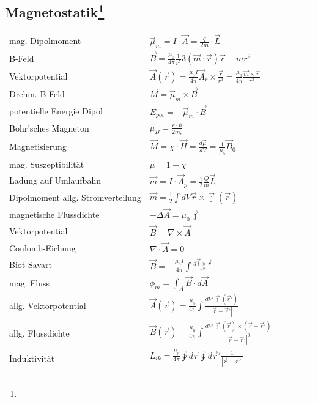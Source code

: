 \documentclass[12pt,a4paper]{article}
\newcommand{\abs}[1]{\left| #1 \right|}
\renewcommand{\=}[1]{\stackrel{#1}{=}}
\newcommand{\rd}{\abs{\vec r - \vec r'}}
\newcommand{\ort}{\vec r}
\theoremstyle{definition}
\theoremstyle{remark}
\begin{document}
\subsection[Magnetostatik]{Magnetostatik\let\thefootnote\relax\footnote{}}
\begin{center}
\begin{minipage}[t]{.5\linewidth}
\vspace{0pt}
\noindent\begin{tabular}{ll}
mag. Dipolmoment & $\vec{\mu}_m = I \cdot \vec{A} = \frac{q}{2m} \cdot \vec{L}$\\
B-Feld  & $\vec B = \frac{\mu_0}{4\pi} \frac{1}{r^5} 3(\vec m \cdot \ort)\ort - mr^2$\\
Vektorpotential & $\vec A (\ort) = \frac{\mu_0 I}{4\pi} \vec A_r \times \frac{\ort}{r^3} = \frac{\mu_0}{4\pi} \frac{\vec m \times \vec r}{r^3}$\\
Drehm. B-Feld & $\vec{M} = \vec{\mu}_m \times \vec{B}$\\
potentielle Energie Dipol & $E_{pot} = -\vec{\mu}_m \cdot \vec{B}$\\
Bohr'sches Magneton & $\mu_B = \frac{e \cdot \hbar}{2 m_e}$\\
Magnetisierung & $\vec{M} = \chi \cdot \vec{H} = \frac{d\vec{\mu}}{dV} = \frac{1}{\mu_0} \vec{B}_0$\\
mag. Suszeptibilität & $\mu = 1 + \chi$\\
Ladung auf Umlaufbahn & $\vec m = I \cdot \vec A_p = \frac{1}{2} \frac{Q}{m} \vec L$\\
Dipolmoment allg. Stromverteilung & $\vec m = \frac{1}{2} \int dV \ort \times \vec \jmath (\ort)$\\
magnetische Flussdichte & $-\Delta \vec A = \mu_0 \vec \jmath$\\
Vektorpotential & $\vec B = \nabla \times \vec A$\\
Coulomb-Eichung & $\nabla \cdot \vec A = 0$\\
Biot-Savart & $\vec{B} = -\frac{\mu_0 I}{4\pi} \int \frac{d\vec{l}\times\vec{r}}{r^2}$\\
mag. Fluss & $\phi_m = \int_A \vec{B} \cdot d\vec{A}$\\
allg. Vektorpotential & $\vec A (\vec r) = \frac{\mu_0}{4\pi} \int \frac{dV' \vec \jmath (\vec r')}{\abs{ \vec r - \vec r'}}$\\
allg. Flussdichte & $\vec B (\vec r) = \frac{\mu_0}{4\pi} \int \frac{dV' \vec \jmath (\vec r) \times (\vec r - \vec r')}{\abs{\vec r - \vec r'}^3}$\\
Induktivität & $L_{ik} = \frac{\mu_0}{4\pi} \oint d\vec r \oint d\vec r' \frac{1}{\rd}$\\

\end{tabular}
\end{minipage}
\end{center}
\end{document}
